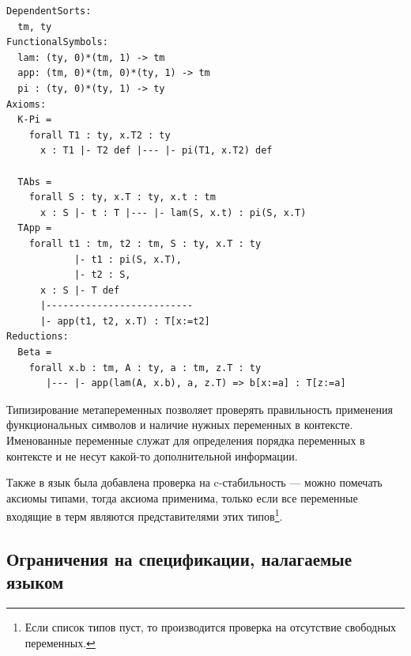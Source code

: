 \begin{lstlisting}
DependentSorts:
  tm, ty
FunctionalSymbols:
  lam: (ty, 0)*(tm, 1) -> tm
  app: (tm, 0)*(tm, 0)*(ty, 1) -> tm
  pi : (ty, 0)*(ty, 1) -> ty
Axioms:
  K-Pi =
    forall T1 : ty, x.T2 : ty
      x : T1 |- T2 def |--- |- pi(T1, x.T2) def

  TAbs =
    forall S : ty, x.T : ty, x.t : tm
      x : S |- t : T |--- |- lam(S, x.t) : pi(S, x.T)
  TApp =
    forall t1 : tm, t2 : tm, S : ty, x.T : ty
            |- t1 : pi(S, x.T),
            |- t2 : S,
      x : S |- T def
      |--------------------------
      |- app(t1, t2, x.T) : T[x:=t2]
Reductions:
  Beta =
    forall x.b : tm, A : ty, a : tm, z.T : ty
       |--- |- app(lam(A, x.b), a, z.T) => b[x:=a] : T[z:=a]

\end{lstlisting}

Типизирование метапеременных позволяет проверять правильность применения функциональных символов и наличие нужных переменных в контексте. Именованные переменные служат для определения порядка переменных в контексте и не несут какой-то дополнительной информации.

Также в язык была добавлена проверка на c-стабильность --- можно помечать аксиомы типами, тогда аксиома применима, только если все переменные входящие в терм являются представителями этих типов\footnote{Если список типов пуст, то производится проверка на отсутствие свободных переменных.}.

\subsection{Ограничения на спецификации, налагаемые языком}

